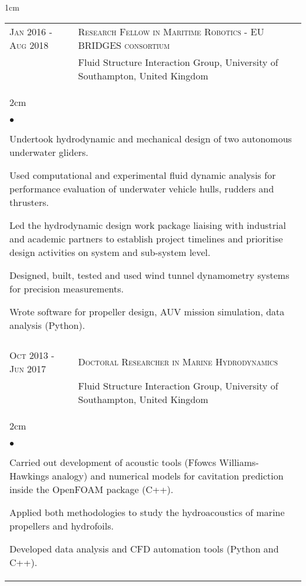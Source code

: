 \documentclass[a4paper,10pt]{article}
\newcommand{\squishlist}{
	\begin{list}{$\bullet$}
	{
		\setlength{\itemsep}{0pt}
		\setlength{\parsep}{0pt}
		\setlength{\topsep}{0pt}
		\setlength{\partopsep}{0pt}
		\setlength{\leftmargin}{2em}
		\setlength{\labelwidth}{1.5em}
		\setlength{\labelsep}{0.5em}
	}
}
\newcommand{\squishend}{\end{list}}
\begin{document}
\begin{minipage}{\textwidth}
\begin{adjustwidth}{}{1cm}
\begin{tabular}{p{3.5cm} p{12.9cm}}
\textsc{Jan 2016 - Aug 2018} & \textsc{Research Fellow in Maritime Robotics - EU BRIDGES consortium} \\
							& Fluid Structure Interaction Group, University of Southampton, United Kingdom \vspace{0.1cm} \\
%
\multicolumn{2}{l}{
\hspace{1cm}\begin{minipage}[t]{\textwidth}
\begin{adjustwidth}{}{2cm}
\squishlist
	\item Undertook hydrodynamic and mechanical design of two autonomous underwater gliders.
	\item Used computational and experimental fluid dynamic analysis for performance
		evaluation of underwater vehicle hulls, rudders and thrusters.
	\item Led the hydrodynamic design work package liaising with industrial and academic
		partners to establish project timelines and prioritise design activities on system and sub-system level.
	\item Designed, built, tested and used wind tunnel dynamometry systems for precision measurements.
	\item Wrote software for propeller design, AUV mission simulation, data analysis (Python).
\squishend
\end{adjustwidth}
\end{minipage}
} \\
\\

\textsc{Oct 2013 - Jun 2017} & \textsc{Doctoral Researcher in Marine Hydrodynamics} \\%
							& Fluid Structure Interaction Group, University of Southampton, United Kingdom \vspace{0.1cm} \\
%
\multicolumn{2}{l}{
\hspace{1cm}\begin{minipage}[t]{\textwidth}
\begin{adjustwidth}{}{2cm}
\squishlist
	\item Carried out development of acoustic tools (Ffowcs Williams-Hawkings analogy)
		and numerical models for cavitation prediction inside the OpenFOAM package (C++).
	\item Applied both methodologies to study the hydroacoustics of marine propellers and hydrofoils.
	\item Developed data analysis and CFD automation tools (Python and C++).
\squishend
\end{adjustwidth}
\end{minipage}
} \\


\end{tabular}
\end{adjustwidth}
\end{minipage}
\end{document}
